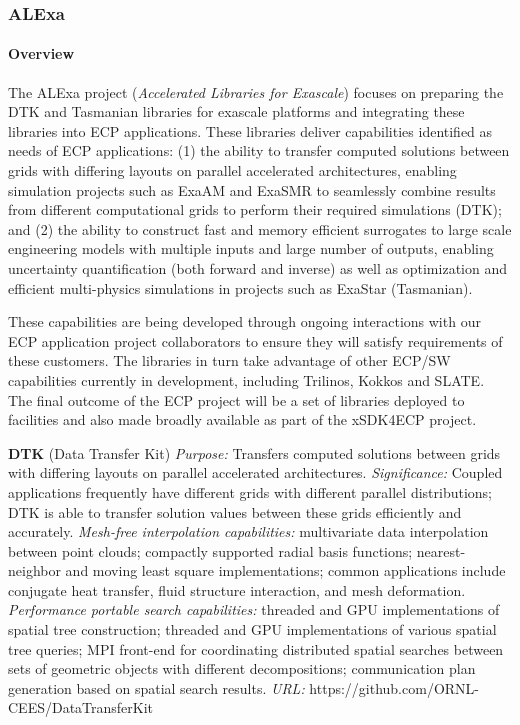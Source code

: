 \subsubsection{ ALExa}


\paragraph{Overview}

The ALExa project ({\sl Accelerated Libraries for
Exascale})
focuses on preparing the DTK and Tasmanian libraries for
exascale platforms and integrating these libraries into ECP
applications.  These libraries deliver capabilities
identified as needs of ECP applications: (1) the ability to
transfer computed solutions between grids with differing
layouts on parallel accelerated architectures,
enabling simulation projects such as ExaAM and ExaSMR to
seamlessly combine results from different computational
grids to perform their required simulations (DTK); and
%
(2) the ability to construct fast and memory efficient
surrogates to large scale engineering models with
multiple inputs and large number of outputs, enabling
uncertainty quantification (both forward and inverse)
as well as optimization and efficient multi-physics
simulations in projects such as ExaStar (Tasmanian).

These capabilities
are being developed through ongoing interactions with our
ECP application project collaborators to ensure they will
satisfy requirements of these customers.  The libraries in
turn take advantage of other ECP/SW capabilities currently in
development, including Trilinos, Kokkos and SLATE.  The
final outcome of the ECP project will be a set of
libraries deployed to facilities
and also made broadly available as part of the xSDK4ECP
project.

{\bf DTK} (Data Transfer Kit)
{\it Purpose:}
Transfers computed solutions between grids with differing
layouts on parallel accelerated architectures.
{\it Significance:} Coupled applications frequently have
different grids with different parallel distributions; DTK
is able to transfer solution values between these grids
efficiently and accurately.
{\it Mesh-free interpolation capabilities:}
multivariate data interpolation between point clouds;
compactly supported radial basis functions;
nearest-neighbor and moving least square implementations;
common applications include conjugate heat transfer,
fluid structure interaction, and mesh deformation.
{\it Performance portable search capabilities:}
threaded and GPU implementations of spatial tree
construction;
threaded and GPU implementations of various spatial tree
queries;
MPI front-end for coordinating distributed spatial searches
between sets of geometric objects with different
decompositions;
communication plan generation based on spatial search
results.
{\it URL:}
https://github.com/ORNL-CEES/DataTransferKit

